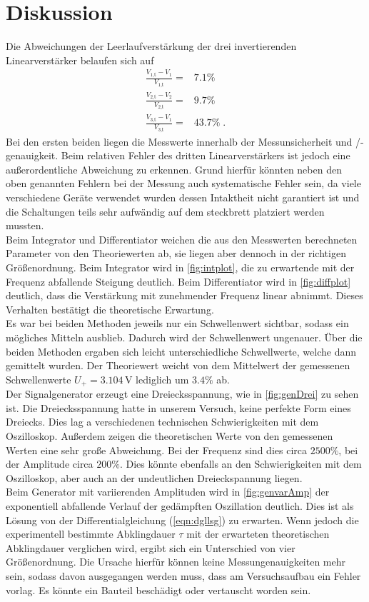 \section{Diskussion}
\label{sec:Diskussion}
Die Abweichungen der Leerlaufverstärkung der drei invertierenden Linearverstärker belaufen sich auf 
\begin{align*}
    \frac{V_{1\text{,t}}-V_1}{V_{1\text{,t}}}=&7.1\%\\
    \frac{V_{2\text{,t}}-V_2}{V_{2\text{,t}}}=&9.7\%\\
    \frac{V_{3\text{,t}}-V_1}{V_{3\text{,t}}}=&43.7\%\; .
\end{align*}
Bei den ersten beiden liegen die Messwerte innerhalb der Messunsicherheit und /-genauigkeit. Beim relativen Fehler des dritten Linearverstärkers ist jedoch eine außerordentliche Abweichung zu erkennen.
Grund hierfür könnten neben den oben genannten Fehlern bei der Messung auch systematische Fehler sein, da viele verschiedene Geräte verwendet wurden dessen Intaktheit nicht garantiert ist und die Schaltungen teils sehr aufwändig 
auf dem steckbrett platziert werden mussten.
\\
Beim Integrator und Differentiator weichen die aus den Messwerten berechneten Parameter von den Theoriewerten ab, sie liegen aber dennoch 
in der richtigen Größenordnung. Beim Integrator wird in \autoref{fig:intplot}, die zu erwartende mit der Frequenz abfallende Steigung deutlich. 
Beim Differentiator wird in \autoref{fig:diffplot} deutlich, dass die Verstärkung mit zunehmender Frequenz linear 
abnimmt. Dieses Verhalten bestätigt die theoretische Erwartung.
\\
Es war bei beiden Methoden jeweils nur ein Schwellenwert sichtbar, sodass ein mögliches Mitteln ausblieb. Dadurch wird 
der Schwellenwert ungenauer. Über die beiden Methoden ergaben sich leicht unterschiedliche Schwellwerte, welche dann gemittelt wurden. Der Theoriewert weicht von dem Mittelwert der gemessenen Schwellenwerte $U_+ = 3.104\,\unit{\volt}$ 
lediglich um $3.4\%$ ab.
\\
Der Signalgenerator erzeugt eine Dreiecksspannung, wie in \autoref{fig:genDrei} zu sehen ist. Die Dreiecksspannung hatte in unserem Versuch, 
keine perfekte Form eines Dreiecks. Dies lag a verschiedenen technischen Schwierigkeiten mit dem Oszilloskop. Außerdem zeigen die theoretischen Werte 
von den gemessenen Werten eine sehr große Abweichung. Bei der Frequenz sind dies circa $2500\%$, bei der Amplitude circa $200\%$. Dies könnte ebenfalls 
an den Schwierigkeiten mit dem Oszilloskop, aber auch an der undeutlichen Dreieckspannung liegen.
\\
Beim Generator mit variierenden Amplituden wird in \autoref{fig:genvarAmp} der exponentiell abfallende Verlauf der gedämpften Oszillation 
deutlich. Dies ist als Lösung von der Differentialgleichung (\autoref{eqn:dgllsg}) zu erwarten. Wenn jedoch die experimentell  bestimmte 
Abklingdauer $\tau$ mit der erwarteten theoretischen Abklingdauer verglichen wird, ergibt sich ein Unterschied von vier Größenordnung. 
Die Ursache hierfür können keine Messungenauigkeiten mehr sein, sodass davon ausgegangen werden muss, dass am Versuchsaufbau ein Fehler vorlag. 
Es könnte ein Bauteil beschädigt oder vertauscht worden sein.